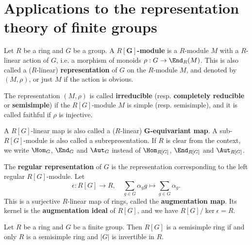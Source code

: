\section{Applications to the representation theory of finite groups}
\begin{definition}
Let $R$ be a ring and $G$ be a group. A \textbf{$R[\bm{G}]$-module} is a $R$-module $M$ with a $R$-linear action of $G$, i.e. a morphism of monoids $
\rho:G\to\End_R(M)$. This is also called a ($R$-linear) \textbf{representation} of $G$ on the $R$-module $M$, and denoted by $(M,\rho)$, or just $M$ if the action is obvious.
\end{definition}
The representation $(M,\rho)$ is called \textbf{irreducible} (resp. \textbf{completely reducible} or \textbf{semisimple}) if the $R[G]$-module $M$ is simple (resp. semisimple), and it is called faithful if $\rho$ is injective.\par
A $R[G]$-linear map is also called a ($R$-linear) \textbf{$\bm{G}$-equivariant map}. A sub-$R[G]$-module is also called a subrepresentation. If $R$ is clear from the context, we write $\Hom_G$, $\End_G$ and $\Aut_G$ instead of $\Hom_{R[G]}$, $\End_{R[G]}$ and $\Aut_{R[G]}$.\par
The \textbf{regular representation} of $G$ is the representation corresponding to the left regular $R[G]$-module. Let 
\[\epsilon:R[G]\to R,\quad\sum_{g\in G}\alpha_gg\mapsto\sum_{g\in G}\alpha_g.\] This is a surjective $R$-linear map of rings, called the \textbf{augmentation map}. Its kernel is the \textbf{augmentation ideal} of $R[G]$, and we have $R[G]/\ker\epsilon=R$.
\begin{theorem}\label{Maschke generalize}
Let $R$ be a ring and $G$ be a finite group. Then $R[G]$ is a semisimple ring if and only $R$ is a semisimple ring and $|G|$ is invertible in $R$.
\end{theorem}
